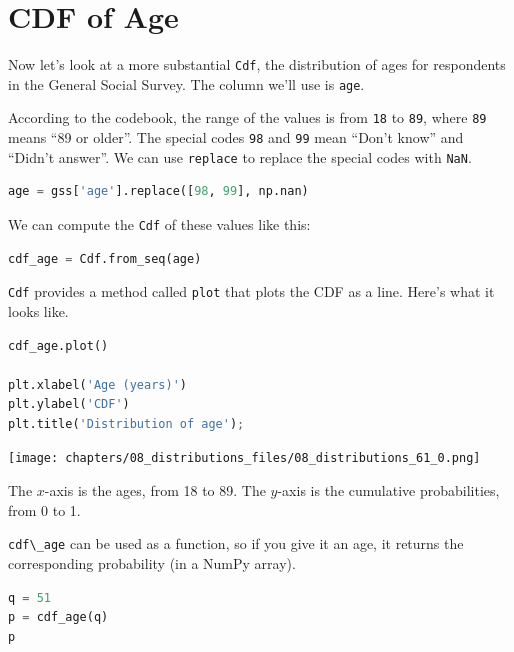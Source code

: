 \hypertarget{cdf-of-age}{%
\section{CDF of Age}\label{cdf-of-age}}

Now let's look at a more substantial \passthrough{\lstinline!Cdf!}, the
distribution of ages for respondents in the General Social Survey. The
column we'll use is \passthrough{\lstinline!age!}.

According to the codebook, the range of the values is from
\passthrough{\lstinline!18!} to \passthrough{\lstinline!89!}, where
\passthrough{\lstinline!89!} means ``89 or older''. The special codes
\passthrough{\lstinline!98!} and \passthrough{\lstinline!99!} mean
``Don't know'' and ``Didn't answer''. We can use
\passthrough{\lstinline!replace!} to replace the special codes with
\passthrough{\lstinline!NaN!}.

\begin{lstlisting}[language=Python,style=source]
age = gss['age'].replace([98, 99], np.nan)
\end{lstlisting}

We can compute the \passthrough{\lstinline!Cdf!} of these values like
this:

\begin{lstlisting}[language=Python,style=source]
cdf_age = Cdf.from_seq(age)
\end{lstlisting}

\passthrough{\lstinline!Cdf!} provides a method called
\passthrough{\lstinline!plot!} that plots the CDF as a line. Here's what
it looks like.

\begin{lstlisting}[language=Python,style=source]
cdf_age.plot()

plt.xlabel('Age (years)')
plt.ylabel('CDF')
plt.title('Distribution of age');
\end{lstlisting}

\begin{center}
\texttt{[image: chapters/08\_distributions\_files/08\_distributions\_61\_0.png]}
\end{center}

The \(x\)-axis is the ages, from 18 to 89. The \(y\)-axis is the
cumulative probabilities, from 0 to 1.

\passthrough{\lstinline!cdf\_age!} can be used as a function, so if you
give it an age, it returns the corresponding probability (in a NumPy
array).

\begin{lstlisting}[language=Python,style=source]
q = 51
p = cdf_age(q)
p
\end{lstlisting}

